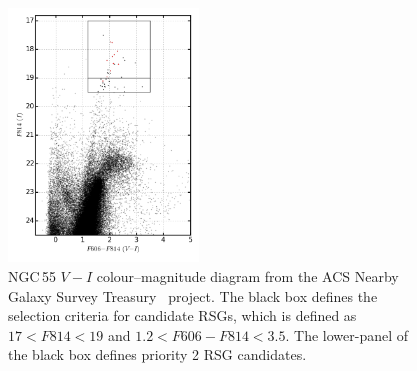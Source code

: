 \begin{figure}
  \centering
  \includegraphics[width=0.45\textwidth]{ngc55/ngc55-v_i_angst}
 \caption[NGC\,55 $V-I$ colour--magnitude diagram]{
  NGC\,55 $V-I$ colour--magnitude diagram from the ACS Nearby Galaxy Survey Treasury~\citep[ANGST][]{2009ApJS..183...67D} project.
  The black box defines the selection criteria for candidate RSGs, which is defined as $17 < F814 < 19$ and $1.2 < F606-F814 < 3.5$.
  The lower-panel of the black box defines priority 2 RSG candidates.
          }
 \label{fig:VI}
\end{figure}




